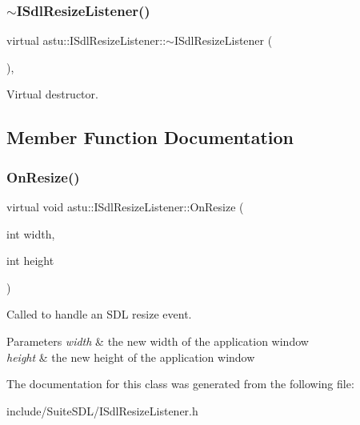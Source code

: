 \subsubsection{\texorpdfstring{$\sim$\+I\+Sdl\+Resize\+Listener()}{~ISdlResizeListener()}}
{\footnotesize\ttfamily virtual astu\+::\+I\+Sdl\+Resize\+Listener\+::$\sim$\+I\+Sdl\+Resize\+Listener (\begin{DoxyParamCaption}{ }\end{DoxyParamCaption})\hspace{0.3cm}{\ttfamily [inline]}, {\ttfamily [virtual]}}

Virtual destructor. 

\subsection{Member Function Documentation}
\mbox{\label{classastu_1_1ISdlResizeListener_ae938c37edfecbc9f3bd60a4cb3b2419c}} 
\subsubsection{\texorpdfstring{On\+Resize()}{OnResize()}}
{\footnotesize\ttfamily virtual void astu\+::\+I\+Sdl\+Resize\+Listener\+::\+On\+Resize (\begin{DoxyParamCaption}\item[{int}]{width,  }\item[{int}]{height }\end{DoxyParamCaption})\hspace{0.3cm}{\ttfamily [pure virtual]}}

Called to handle an S\+DL resize event.


\begin{DoxyParams}{Parameters}
{\em width} & the new width of the application window \\
\hline
{\em height} & the new height of the application window \\
\hline
\end{DoxyParams}


The documentation for this class was generated from the following file\+:\begin{DoxyCompactItemize}
\item 
include/\+Suite\+S\+D\+L/I\+Sdl\+Resize\+Listener.\+h\end{DoxyCompactItemize}
